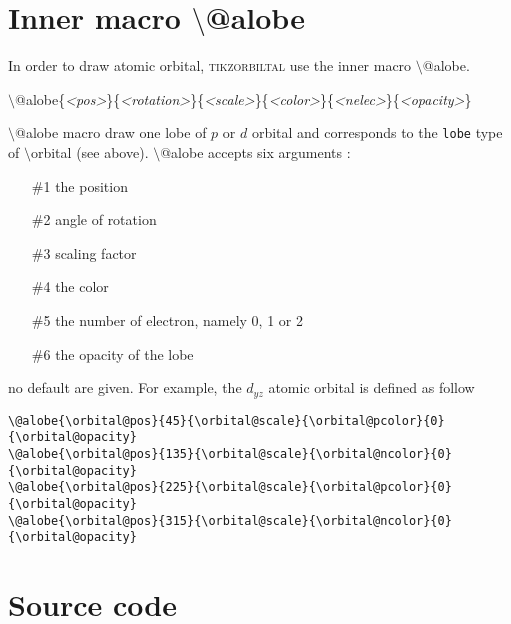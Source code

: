 \documentclass[10pt]{article}
\newcommand*{\cmd}[1]{{\ttfamily\color{blue!50!black}$\setminus$#1}\xspace}
\newcommand*{\marg}[1]{{\ttfamily\itshape\color{red!95!black}<#1>}\xspace}
\newcommand{\package}{\textsc{\sffamily\color{blue!50!black}tikzorbiltal}\xspace}
\begin{document}
\section{Inner macro \cmd{@alobe}}

In order to draw atomic orbital, \package use the inner macro \cmd{@alobe}.

\cmd{@alobe}\{\marg{pos}\}\{\marg{rotation}\}\{\marg{scale}\}\{\marg{color}\}\{\marg{nelec}\}\{\marg{opacity}\}

\cmd{@alobe} macro draw one lobe of $p$ or $d$ orbital and corresponds to the \texttt{lobe} type of \cmd{orbital} (see above). \cmd{@alobe} accepts six arguments :

\begin{enumerate}
     \item[\#1] the position
     \item[\#2] angle of rotation
     \item[\#3] scaling factor
     \item[\#4] the color
     \item[\#5] the number of electron, namely 0, 1 or 2
     \item[\#6] the opacity of the lobe
\end{enumerate}
%
no default are given. For example, the $d_{yz}$ atomic orbital is defined as follow

\begin{lstlisting}
\@alobe{\orbital@pos}{45}{\orbital@scale}{\orbital@pcolor}{0}{\orbital@opacity}   
\@alobe{\orbital@pos}{135}{\orbital@scale}{\orbital@ncolor}{0}{\orbital@opacity} 
\@alobe{\orbital@pos}{225}{\orbital@scale}{\orbital@pcolor}{0}{\orbital@opacity} 
\@alobe{\orbital@pos}{315}{\orbital@scale}{\orbital@ncolor}{0}{\orbital@opacity} 
\end{lstlisting}

\section{Source code}


\end{document}
